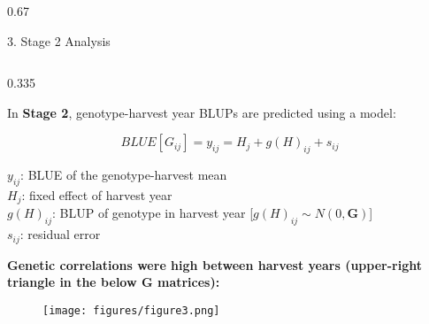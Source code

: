 \documentclass[final]{beamer}
\newlength{\twocolwid}
\begin{document}
\begin{frame}[t]
\begin{columns}[t]
\begin{column}{\twocolwid}

\begin{columns}[t,totalwidth=\twocolwid] %

\begin{column}{0.67\twocolwid}




\begin{block}{3. Stage 2 Analysis}



\begin{columns}[t,totalwidth=0.67\twocolwid] %

\begin{column}{0.335\twocolwid}
\vspace{-2cm}


\begin{footnotesize}

In \textbf{Stage 2}, genotype-harvest year BLUPs are predicted using a model:

\begin{equation*}
BLUE[G_{ij}] = y_{ij} = H_j + g(H)_{ij} + s_{ij}
\end{equation*}

$y_{ij}$: BLUE of the genotype-harvest mean \\
$H_j$: fixed effect of harvest year \\
$g(H)_{ij}$: BLUP of genotype in harvest year [$g(H)_{ij} \sim N(0, \mathbf{G})$] \\
$s_{ij}$: residual error


\vspace{1cm}

\textbf{Genetic correlations were high between harvest years (upper-right triangle in the below $\mathbf{G}$ matrices):}

\end{footnotesize}

\begin{center}
  \begin{figure}
    \texttt{[image: figures/figure3.png]}
  \end{figure}
\end{center}





\end{column}
\end{columns}
\end{block}
\end{column}
\end{columns}
\end{column}
\end{columns}
\end{frame}
\end{document}
